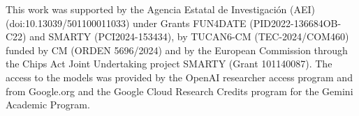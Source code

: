 \documentclass{article}
\begin{document}
This work was supported by the Agencia Estatal de Investigación (AEI) (doi:10.13039/501100011033) under Grants FUN4DATE (PID2022-136684OB-C22) and SMARTY (PCI2024-153434), by TUCAN6-CM (TEC-2024/COM460) funded by CM (ORDEN 5696/2024) and by the European Commission through the Chips Act Joint Undertaking project SMARTY (Grant 101140087). The access to the models was provided by the OpenAI researcher access program and from Google.org and the Google Cloud Research Credits program for the Gemini Academic Program.



\end{document}
